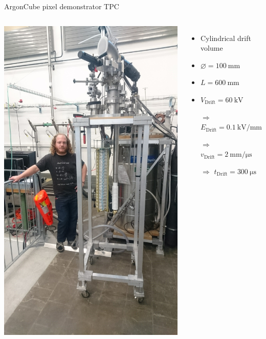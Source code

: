 \documentclass[]{beamer}
\newcommand*{\m}{\mathrm}
\newcommand*{\emphcol}{red}
\newcommand*{\AC}{{ArgonCube}}
\begin{document}
\begin{frame}{\AC{} pixel demonstrator TPC}
	\begin{columns}[c]
		\centering
		\includegraphics[viewport=1200 200 2500 1800, clip, height=\textwidth, angle=-90]{defence/TPC}
		\begin{itemize}
			\item Cylindrical drift volume
			\item $\varnothing = \SI{100}{\milli\meter}$
			\item $L = \SI{600}{\milli\meter}$
			\item $V_{\m{Drift}} = \SI{60}{\kilo\volt}$
			\item[$\Rightarrow$] {\color{\emphcol} $E_{\m{Drift}} = \SI{0.1}{\kilo\volt\per\milli\meter}$}
			\item[$\Rightarrow$] $v_{\m{Drift}} = \SI{2}{\milli\meter\per\micro\second}$
			\item[$\Rightarrow$] {\color{\emphcol} $t_{\m{Drift}} = \SI{300}{\micro\second}$}
		\end{itemize}
	\end{columns}
\end{frame}
\end{document}
